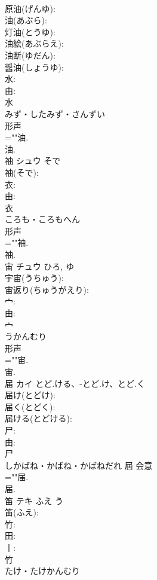 \documentclass[8pt]{extreport}
\begin{document}
\begin{CJK}{UTF8}{min}
\\	原油(げんゆ): 
\\	油(あぶら): 
\\	灯油(とうゆ): 
\\	油絵(あぶらえ): 
\\	油断(ゆだん): 
\\	醤油(しょうゆ): 
\\	水: 
\\	由: 
\\	水	
\\	みず・したみず・さんずい	
\\	形声 
\\	=""油.
\\	油.
\\	袖	シュウ	そで		
\\	袖(そで): 
\\	衣: 
\\	由: 
\\	衣	
\\	ころも・ころもへん	
\\	形声 
\\	=""袖.
\\	袖.
\\	宙	チュウ		ひろ, ゆ	
\\	宇宙(うちゅう): 
\\	宙返り(ちゅうがえり): 
\\	宀: 
\\	由: 
\\	宀	
\\	うかんむり	
\\	形声 
\\	=""宙.
\\	宙.
\\	届	カイ	とど.ける、-とど.け、とど.く		
\\	届け(とどけ): 
\\	届く(とどく): 
\\	届ける(とどける): 
\\	尸: 
\\	由: 
\\	尸	
\\	しかばね・かばね・かばねだれ	屆	会意 
\\	=""届.
\\	届.
\\	笛	テキ	ふえ	う	
\\	笛(ふえ): 
\\	竹: 
\\	田: 
\\	丨: 
\\	竹	
\\	たけ・たけかんむり	

\end{CJK}
\end{document}
